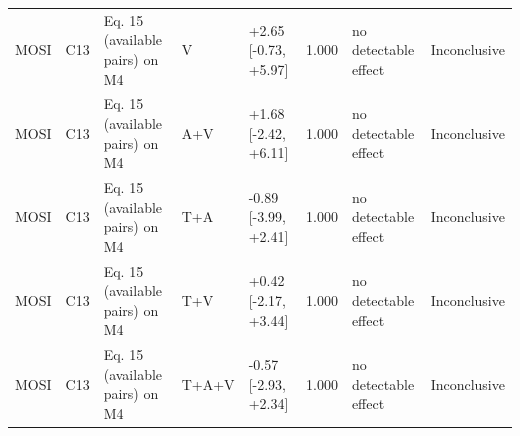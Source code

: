 \begin{landscape}
{\begin{xltabular}{\linewidth}{ll>{\raggedright\arraybackslash}Xlll>{\raggedright\arraybackslash}X>{\raggedright\arraybackslash}X}
MOSI & C13 & Eq. 15 (available pairs) on M4 & V & +2.65 [-0.73, +5.97] & 1.000 & no detectable effect & Inconclusive \\
MOSI & C13 & Eq. 15 (available pairs) on M4 & A+V & +1.68 [-2.42, +6.11] & 1.000 & no detectable effect & Inconclusive \\
MOSI & C13 & Eq. 15 (available pairs) on M4 & T+A & -0.89 [-3.99, +2.41] & 1.000 & no detectable effect & Inconclusive \\
MOSI & C13 & Eq. 15 (available pairs) on M4 & T+V & +0.42 [-2.17, +3.44] & 1.000 & no detectable effect & Inconclusive \\
MOSI & C13 & Eq. 15 (available pairs) on M4 & T+A+V & -0.57 [-2.93, +2.34] & 1.000 & no detectable effect & Inconclusive \\
\end{xltabular}
}
\end{landscape}
